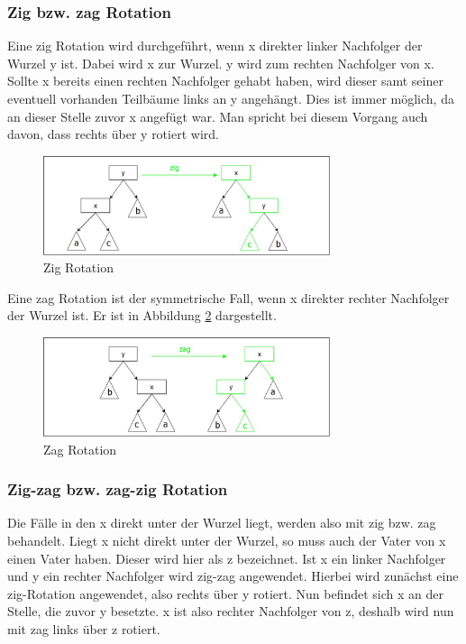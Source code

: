 \documentclass[11pt, a4paper]{article}
\begin{document}
	\subsubsection{Zig bzw. zag Rotation }
		Eine zig Rotation wird durchgeführt, wenn x direkter linker Nachfolger der Wurzel y ist.
		Dabei wird x zur Wurzel. y wird zum rechten Nachfolger von x. Sollte x bereits einen rechten Nachfolger gehabt haben, wird dieser samt seiner eventuell vorhanden Teilbäume links an y angehängt. Dies ist immer möglich, da an dieser Stelle zuvor x angefügt war.  Man spricht bei diesem Vorgang auch davon, dass rechts über y rotiert wird.
						
		\begin{figure}[h]
			\centering
			\includegraphics[width=0.75\textwidth]{"bilder/zigRotation"}
			\caption{Zig Rotation}
			\label{fig:zigRotation}
		\end{figure}
		
		\noindent Eine zag Rotation ist der symmetrische Fall, wenn x direkter rechter Nachfolger der Wurzel ist. Er ist in Abbildung \ref{fig:zagRotation} dargestellt.
		
		\begin{figure}[h]
			\centering
			\includegraphics[width=0.75\textwidth]{"bilder/zagRotation"}
			\caption{Zag Rotation}
			\label{fig:zagRotation}
		\end{figure}
		  
		
	\subsubsection{Zig-zag bzw. zag-zig Rotation }
	Die Fälle in den x direkt unter der Wurzel liegt, werden also mit zig bzw. zag behandelt. 
	Liegt x nicht direkt unter der Wurzel, so muss auch der Vater von x einen Vater haben. Dieser wird 
	hier als z bezeichnet. Ist x ein linker Nachfolger und y ein rechter Nachfolger wird zig-zag angewendet.
	Hierbei wird zunächst eine zig-Rotation angewendet, also rechts über y rotiert. Nun befindet sich x an
	der Stelle, die zuvor y besetzte. x ist also rechter Nachfolger von z, deshalb wird nun mit zag links über z rotiert. 
	
\end{document}
